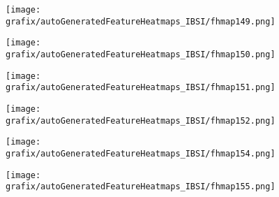 \hspace{\hsp} 
\begin{subfigure}{\wid\textwidth} 
    \centering 
    \caption{\tiny \sffamily {}} 
    \vspace{\vsp} 
    \texttt{[image: grafix/autoGeneratedFeatureHeatmaps\_IBSI/fhmap149.png]} 
\end{subfigure} 
\hspace{\hsp} 
\begin{subfigure}{\wid\textwidth} 
    \centering 
    \caption{\tiny \sffamily {}} 
    \vspace{\vsp} 
    \texttt{[image: grafix/autoGeneratedFeatureHeatmaps\_IBSI/fhmap150.png]} 
\end{subfigure} 
\hspace{\hsp} 
\begin{subfigure}{\wid\textwidth} 
    \centering 
    \caption{\tiny \sffamily {}} 
    \vspace{\vsp} 
    \texttt{[image: grafix/autoGeneratedFeatureHeatmaps\_IBSI/fhmap151.png]} 
\end{subfigure} 
\hspace{\hsp} 
\begin{subfigure}{\wid\textwidth} 
    \centering 
    \caption{\tiny \sffamily {}} 
    \vspace{\vsp} 
    \texttt{[image: grafix/autoGeneratedFeatureHeatmaps\_IBSI/fhmap152.png]} 
\end{subfigure} 
\hspace{\hsp} 
\begin{subfigure}{\wid\textwidth} 
    \centering 
    \caption{\small \sffamily {}} 
\end{subfigure} 
\hspace{\hsp} 
\begin{subfigure}{\wid\textwidth} 
    \centering 
    \caption{\tiny \sffamily {}} 
    \vspace{\vsp} 
    \texttt{[image: grafix/autoGeneratedFeatureHeatmaps\_IBSI/fhmap154.png]} 
\end{subfigure} 
\hspace{\hsp} 
\begin{subfigure}{\wid\textwidth} 
    \centering 
    \caption{\tiny \sffamily {}} 
    \vspace{\vsp} 
    \texttt{[image: grafix/autoGeneratedFeatureHeatmaps\_IBSI/fhmap155.png]} 
\end{subfigure} 
